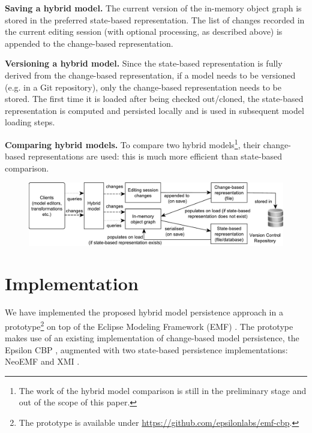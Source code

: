 \documentclass{llncs}
\begin{document}
\textbf{Saving a hybrid model.} The current version of the in-memory object graph is stored in the preferred state-based representation. The list of changes recorded in the current editing session (with optional processing, as described above) is appended to the change-based representation.

\textbf{Versioning a hybrid model.} Since the state-based representation is fully derived from the change-based representation, if a model needs to be versioned (e.g. in a Git repository), only the change-based representation needs to be stored. The first time it is loaded after being checked out/cloned, the state-based representation is computed and persisted locally and is used in subsequent model loading steps.

\textbf{Comparing hybrid models.} To compare two hybrid models\footnote{The work of the hybrid model comparison is still in the preliminary stage and out of the scope of this paper.}, their change-based representations are used: this is much more efficient than state-based comparison. 

\begin{figure}[t]
    \includegraphics[width=\linewidth]{images/hybrid_persistence}
    \label{fig:hybrid_persistence}
\end{figure}

\vspace{-15pt}
\section{Implementation}
\label{sec:implementation}

\vspace{-10pt}
We have implemented the proposed hybrid model persistence approach in a prototype\footnote{The prototype is available under \url{https://github.com/epsilonlabs/emf-cbp}.} on top of the Eclipse Modeling Framework (EMF) \cite{steinberg2008emf}. The prototype makes use of an existing implementation of change-based model persistence, the Epsilon CBP \cite{DBLP:conf/models/YohannisKP17}, augmented with two state-based persistence implementations: NeoEMF \cite{daniel2016neoemf} and XMI \cite{omg2018xmi}.
\end{document}
